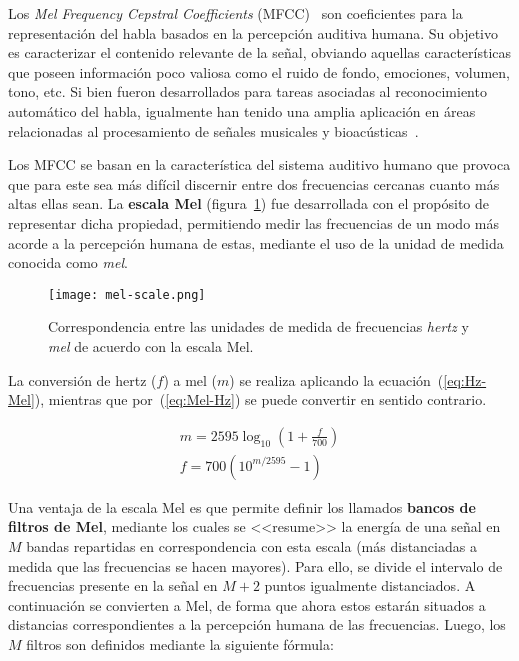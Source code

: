 Los \textit{Mel Frequency Cepstral Coefficients} (MFCC)~\cite{Davis80} son coeficientes para la representación del habla basados en la percepción auditiva humana.
Su objetivo es caracterizar el contenido relevante de la señal, obviando aquellas características que poseen información poco valiosa como el ruido de fondo, emociones, volumen, tono, etc.
Si bien fueron desarrollados para tareas asociadas al reconocimiento automático del habla, igualmente han tenido una amplia aplicación en áreas relacionadas al procesamiento de señales musicales y bioacústicas~\cite{Clemins05,Cowling03,Dufour14,Fagerlund07,Lee06,Li01,McKinney03,Mitrovic06}.

Los MFCC se basan en la característica del sistema auditivo humano que provoca que para este sea más difícil discernir entre dos frecuencias cercanas cuanto más altas ellas sean.
La \textbf{escala Mel} (figura~\ref{img:mel-scale}) fue desarrollada con el propósito de representar dicha propiedad, permitiendo medir las frecuencias de un modo más acorde a la percepción humana de estas, mediante el uso de la unidad de medida conocida como \textit{mel}.

\begin{figure}[!h]
    \centering
    \texttt{[image: mel-scale.png]}
    \caption{Correspondencia entre las unidades de medida de frecuencias \textit{hertz} y \textit{mel} de acuerdo con la escala Mel.}
    \label{img:mel-scale}
\end{figure}

La conversión de hertz ($f$) a mel ($m$) se realiza aplicando la ecuación~(\ref{eq:Hz-Mel}), mientras que por~(\ref{eq:Mel-Hz}) se puede convertir en sentido contrario.

\begin{gather}
    \label{eq:Hz-Mel}
    m = 2595\log_{10}\left( 1 + \frac{f}{700} \right) \\
    \label{eq:Mel-Hz}
    f = 700\left( 10^{m/2595} - 1 \right)
\end{gather}

Una ventaja de la escala Mel es que permite definir los llamados \textbf{bancos de filtros de Mel}, mediante los cuales se <<resume>> la energía de una señal en $M$ bandas repartidas en correspondencia con esta escala (más distanciadas a medida que las frecuencias se hacen mayores).
Para ello, se divide el intervalo de frecuencias presente en la señal en $M+2$ puntos igualmente distanciados.
A continuación se convierten a Mel, de forma que ahora estos estarán situados a distancias correspondientes a la percepción humana de las frecuencias.
Luego, los $M$ filtros son definidos mediante la siguiente fórmula:

